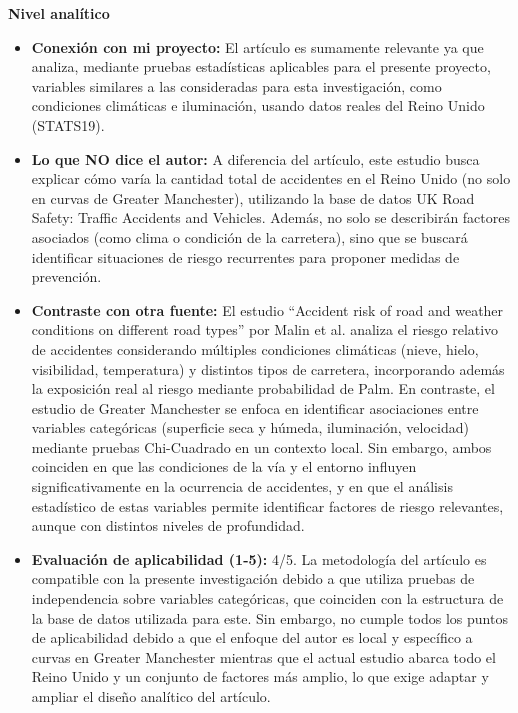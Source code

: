 \documentclass[12pt]{article}
\begin{document}
\textbf{Nivel analítico}

\begin{itemize}
    \item \textbf{Conexión con mi proyecto:} El artículo es sumamente relevante ya que analiza, mediante pruebas estadísticas 
    aplicables para el presente proyecto, variables similares a las consideradas para esta investigación, como condiciones 
    climáticas e iluminación, usando datos reales del Reino Unido (STATS19). 
    
	\item \textbf{Lo que NO dice el autor:} A diferencia del artículo, este estudio busca explicar cómo varía la cantidad
    total de accidentes en el Reino Unido (no solo en curvas de Greater Manchester), utilizando la base de datos UK Road 
    Safety: Traffic Accidents and Vehicles. Además, no solo se describirán factores asociados (como clima o condición de la 
    carretera), sino que se buscará identificar situaciones de riesgo recurrentes para proponer medidas de prevención. 
    
	\item \textbf{Contraste con otra fuente:} El estudio “Accident risk of road and weather conditions on different road 
    types” por Malin et al. analiza el riesgo relativo de accidentes considerando múltiples condiciones climáticas (nieve, 
    hielo, visibilidad, temperatura) y distintos tipos de carretera, incorporando además la exposición real al riesgo mediante 
    probabilidad de Palm. En contraste, el estudio de Greater Manchester se enfoca en identificar asociaciones entre variables
    categóricas (superficie seca y húmeda, iluminación, velocidad) mediante pruebas Chi-Cuadrado en un contexto local. 
    Sin embargo, ambos coinciden en que las condiciones de la vía y el entorno influyen significativamente en la ocurrencia 
    de accidentes, y en que el análisis estadístico de estas variables permite identificar factores de riesgo relevantes, 
    aunque con distintos niveles de profundidad.  
    
	\item \textbf{Evaluación de aplicabilidad (1-5):} 4/5. La metodología del artículo es compatible con la presente investigación 
    debido a que utiliza pruebas de independencia sobre variables categóricas, que coinciden con la estructura de la base 
    de datos utilizada para este. Sin embargo, no cumple todos los puntos de aplicabilidad debido a que el 
    enfoque del autor es local y específico a curvas en Greater Manchester mientras que el actual estudio abarca todo el 
    Reino Unido y un conjunto de factores más amplio, lo que exige adaptar y ampliar el diseño analítico del artículo.
    

\end{itemize}
\end{document}
